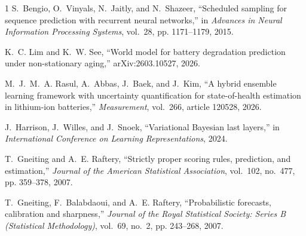 \documentclass[conference]{IEEEtran}
\begin{document}
\begin{thebibliography}{1}
S.~Bengio, O.~Vinyals, N.~Jaitly, and N.~Shazeer, ``Scheduled sampling for
sequence prediction with recurrent neural networks,'' in \emph{Advances in
Neural Information Processing Systems}, vol.~28, pp. 1171--1179, 2015.

K.~C. Lim and K.~W. See, ``World model for battery degradation prediction under
non-stationary aging,'' arXiv:2603.10527, 2026.

M.~J.~M.~A. Rasul, A.~Abbas, J.~Baek, and J.~Kim, ``A hybrid ensemble learning
framework with uncertainty quantification for state-of-health estimation in
lithium-ion batteries,'' \emph{Measurement}, vol.~266, article 120528, 2026.

J.~Harrison, J.~Willes, and J.~Snoek, ``Variational Bayesian last layers,'' in
\emph{International Conference on Learning Representations}, 2024.

T.~Gneiting and A.~E. Raftery, ``Strictly proper scoring rules, prediction,
and estimation,'' \emph{Journal of the American Statistical Association},
vol.~102, no.~477, pp. 359--378, 2007.

T.~Gneiting, F.~Balabdaoui, and A.~E. Raftery, ``Probabilistic forecasts,
calibration and sharpness,'' \emph{Journal of the Royal Statistical Society:
Series B (Statistical Methodology)}, vol.~69, no.~2, pp. 243--268, 2007.
\end{thebibliography}
\end{document}
